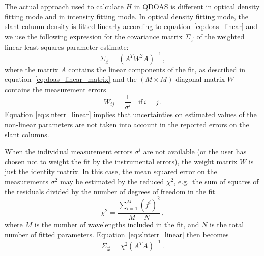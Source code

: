 The actual approach used to calculate $H$ in QDOAS is different in
optical density fitting mode and in intensity fitting mode.  In
optical density fitting mode, the slant column density is fitted
linearly according to equation~\eqref{eq:doas_linear} and we use the
following expression for the covariance matrix $\Sigma_{\vec{x}}$ of
the weighted linear least squares parameter estimate:
\begin{equation}
  \label{eq:slnterr_linear}
  \Sigma_{\vec{x}} = \left(A^T W^2 A\right)^{-1}\,,
\end{equation}
where the matrix $A$ contains the linear components of the fit, as
described in equation~\eqref{eq:doas_linear_matrix} and the $(M \times
M)$ diagonal matrix $W$ contains the measurement errors
\begin{equation}
  \label{eq:weight_matrix}
  W_{ij} = \frac{1}{\sigma^i}\quad \mathrm{if}\, i=j\,.
\end{equation}
Equation \eqref{eq:slnterr_linear} implies that uncertainties on
estimated values of the non-linear parameters are not taken into
account in the reported errors on the slant columns.

When the individual measurement errors $\sigma^i$ are not available
(or the user has chosen not to weight the fit by the instrumental
errors), the weight matrix $W$ is just the identity matrix.  In this
case, the mean squared error on the measurements $\sigma^2$ may be
estimated by the reduced $\chi^2$, e.g.\ the sum of squares of the
residuals divided by the number of degrees of freedom in the fit
\begin{equation}
  \label{eq:chi_square}
  \chi^2 = \frac{\sum_{i=1}^M (f^i)^2 }{M-N}\,,
\end{equation}
where $M$ is the number of wavelengths included in the fit, and $N$ is
the total number of fitted parameters.
Equation~\eqref{eq:slnterr_linear} then becomes
\begin{equation}
  \label{eq:slnterr_linear_noweighting}
  \Sigma_{\vec{x}} = \chi^2\left(A^T A\right)^{-1}\,.
\end{equation}

